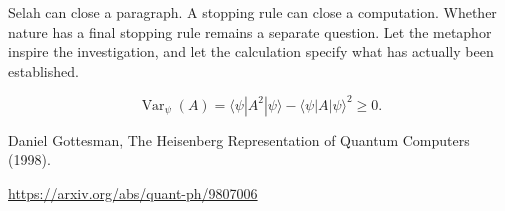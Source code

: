 \documentclass[10pt]{article}
\begin{document}
Selah can close a paragraph. A stopping rule can close a computation. Whether nature has a final stopping rule remains a separate question. Let the metaphor inspire the investigation, and let the calculation specify what has actually been established.\par
\[\operatorname{Var}_{\psi}(A)=\langle\psi|A^2|\psi\rangle-\langle\psi|A|\psi\rangle^2\geq0.\]
{\small Daniel Gottesman, The Heisenberg Representation of Quantum Computers (1998).\par\url{https://arxiv.org/abs/quant-ph/9807006}\par}
\end{document}
